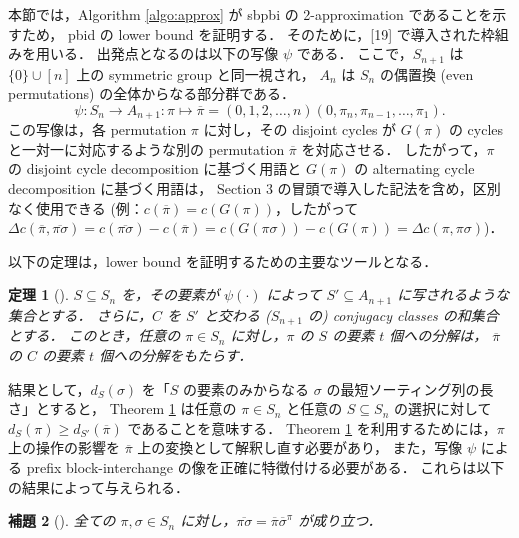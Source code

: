 \documentclass[paper=a4,fontsize=11pt,report,oneside]{jlreq}
\newtheorem{theorem}{定理}[chapter]
\newtheorem{lemma}[theorem]{補題}
\begin{document}
本節では，Algorithm \ref{algo:approx} が sbpbi の 2-approximation であることを示すため，
pbid の lower bound を証明する．
そのために，[19] で導入された枠組みを用いる．
出発点となるのは以下の写像 $\psi$ である．
ここで，$S_{n+1}$ は $\{0\} \cup [n]$ 上の symmetric group と同一視され，
$A_n$ は $S_n$ の偶置換 (even permutations) の全体からなる部分群である．
\begin{equation}
    \psi : S_n \to A_{n+1} : \pi \mapsto \overline{\pi} = (0, 1, 2, \dots, n)(0, \pi_n, \pi_{n-1}, \dots, \pi_1).
    \label{eq:psi}
\end{equation}
この写像は，各 permutation $\pi$ に対し，その disjoint cycles が
$G(\pi)$ の cycles と一対一に対応するような別の permutation $\overline{\pi}$ を対応させる．
したがって，$\pi$ の disjoint cycle decomposition に基づく用語と
$G(\pi)$ の alternating cycle decomposition に基づく用語は，
Section 3 の冒頭で導入した記法を含め，区別なく使用できる
(例：$c(\overline{\pi}) = c(G(\pi))$，したがって
$\Delta c(\overline{\pi}, \overline{\pi\sigma}) = c(\overline{\pi\sigma}) - c(\overline{\pi})
= c(G(\pi\sigma)) - c(G(\pi)) = \Delta c(\pi, \pi\sigma)$)．

以下の定理は，lower bound を証明するための主要なツールとなる．

\begin{theorem}[\cite{labarre2013lower}] \label{thm:factorisation}
    $S \subseteq S_n$ を，その要素が $\psi(\cdot)$ によって $S' \subseteq A_{n+1}$ に写されるような集合とする．
    さらに，$C$ を $S'$ と交わる ($S_{n+1}$ の) conjugacy classes の和集合とする．
    このとき，任意の $\pi \in S_n$ に対し，$\pi$ の $S$ の要素 $t$ 個への分解は，
    $\overline{\pi}$ の $C$ の要素 $t$ 個への分解をもたらす．
\end{theorem}

結果として，$d_S(\sigma)$ を「$S$ の要素のみからなる $\sigma$ の最短ソーティング列の長さ」とすると，
Theorem \ref{thm:factorisation} は任意の $\pi \in S_n$ と任意の $S \subseteq S_n$ の選択に対して
$d_S(\pi) \ge d_{S'}(\overline{\pi})$ であることを意味する．
Theorem \ref{thm:factorisation} を利用するためには，$\pi$ 上の操作の影響を
$\overline{\pi}$ 上の変換として解釈し直す必要があり，
また，写像 $\psi$ による prefix block-interchange の像を正確に特徴付ける必要がある．
これらは以下の結果によって与えられる．

\begin{lemma}[\cite{labarre2013lower}] \label{lem:psi_conjugate}
    全ての $\pi, \sigma \in S_n$ に対し，$\overline{\pi\sigma} = \overline{\pi}\overline{\sigma}^{\pi}$ が成り立つ．
\end{lemma}
\end{document}
